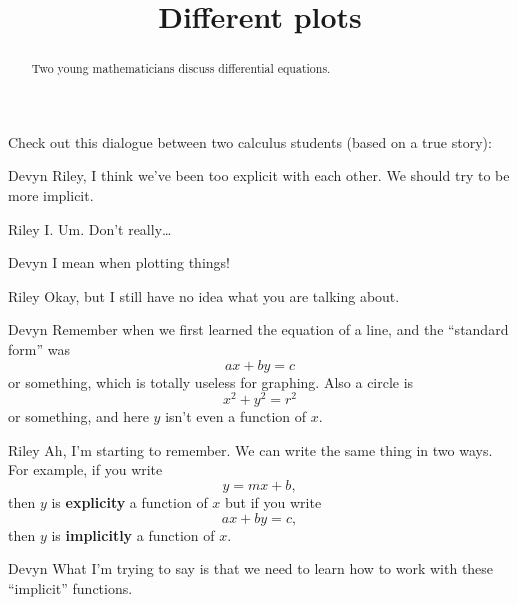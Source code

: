 \documentclass{ximera}
\title[Break-Ground:]{Different plots}
\begin{document}
\begin{abstract}
  Two young mathematicians discuss differential equations.
\end{abstract}
\maketitle








Check out this dialogue between two calculus students (based on a true
story):

\begin{dialogue}
\item[Devyn] Riley, I think we've been too explicit with each
  other. We should try to be more implicit.
\item[Riley] I. Um. Don't really\dots
\item[Devyn] I mean when plotting things!
\item[Riley] Okay, but I still have no idea what you are talking about.
\item[Devyn] Remember when we first learned the equation of a line, and the ``standard form'' was
  \[
  ax+by = c
  \]
  or something, which is totally useless for graphing. Also a circle is
  \[
  x^2 + y^2 = r^2
  \]
  or something, and here $y$ isn't even a function of
  $x$. 
\item[Riley] Ah, I'm starting to remember.  We can write the same thing in two ways.  For example, if you write
  \[
  y = mx + b, %
  \]
 then $y$ is {\bf explicity} a function of $x$ but if you write
    \[
  ax + by = c, %
  \]
  then $y$ is {\bf implicitly} a function of $x$.
\item[Devyn] What I'm trying to say is that we need to learn how to
  work with these ``implicit'' functions. 
\end{dialogue}
\end{document}
